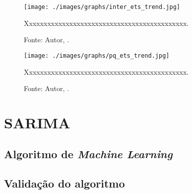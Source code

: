 


\begin{figure}[H]
    \centering
    \texttt{[image: ./images/graphs/inter\_ets\_trend.jpg]}
    \caption{Xxxxxxxxxxxxxxxxxxxxxxxxxxxxxxxxxxxxxxxxxxxx.}
    \label{fig:inter_ets_trend.jpg}
    \caption*{Fonte: Autor, \imprimirdata.}
\end{figure}




\begin{figure}[H]
    \centering
    \texttt{[image: ./images/graphs/pq\_ets\_trend.jpg]}
    \caption{Xxxxxxxxxxxxxxxxxxxxxxxxxxxxxxxxxxxxxxxxxxxx.}
    \label{fig:pq_ets_trend.jpg}
    \caption*{Fonte: Autor, \imprimirdata.}
\end{figure}





\chapter{SARIMA}

\section{Algoritmo de \textit{Machine Learning}}



\section{Validação do algoritmo}


